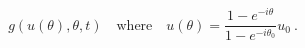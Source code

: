 \begin{equation*}
  g(u(\theta), \theta, t) \quad\text{where}\quad u(\theta) =
  \frac{1-e^{-i\theta}}{1-e^{-i\theta_0}} u_0~.
\end{equation*}

